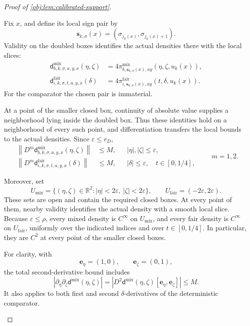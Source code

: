 \begin{proof}[Proof of \cref{obj:lem:calibrated-support}]
\begin{enumerate}
Fix \(x\), and define its local sign pair by
\[
\mathbf s_{k,\sigma}(x)
=(\sigma_{j_k(x)},\sigma_{j_k(x)+1}).
\]
Validity on the doubled boxes identifies the actual densities there with the local slices:
\[
\begin{aligned}
\mathsf d^{\mathrm{mix}}_{b,k,\sigma,a,y,x}(\eta,\zeta)
&=4\pi^{\mathrm{mix}}_{b,\mathbf s_{k,\sigma}(x),ay}
                    (\eta,\zeta,u_k(x)),\\
\mathsf d^{\mathrm{fair}}_{\iota,k,\sigma,t,a,y,x}(\delta)
&=4\pi^{\mathrm{fair}}_{\iota,\mathbf s_{k,\sigma}(x),ay}
                    (t,\delta,u_k(x)).
\end{aligned}
\]
For the comparator the chosen pair is immaterial.

At a point of the smaller closed box, continuity of absolute value supplies a neighborhood lying inside the doubled box. Thus these identities hold on a neighborhood of every such point, and differentiation transfers the local bounds to the actual densities. Since \(\varepsilon\le r_D\),
\[
\begin{aligned}
\left\|D^m\mathsf d^{\mathrm{mix}}_{b,k,\sigma,a,y,x}
                            (\eta,\zeta)\right\|&\le M,
&&|\eta|,|\zeta|\le\varepsilon,\\
\left\|D^m\mathsf d^{\mathrm{fair}}_{\iota,k,\sigma,t,a,y,x}
                            (\delta)\right\|&\le M,
&&|\delta|\le\varepsilon,\quad t\in[0,1/4],
\end{aligned}
\qquad m=1,2.
\]

Moreover, set
\[
U_{\mathrm{mix}}
=\{(\eta,\zeta)\in\mathbb R^2:
                   |\eta|<2\varepsilon,\ |\zeta|<2\varepsilon\},
\qquad
U_{\mathrm{fair}}
=(-2\varepsilon,2\varepsilon).
\]
These sets are open and contain the required closed boxes. At every point of them, nearby validity identifies the actual density with a smooth local slice. Because \(\varepsilon\le\rho\), every mixed density is \(C^\infty\) on \(U_{\mathrm{mix}}\), and every fair density is \(C^\infty\) on \(U_{\mathrm{fair}}\), uniformly over the indicated indices and over \(t\in[0,1/4]\). In particular, they are \(C^2\) at every point of the smaller closed boxes.

For clarity, with
\[
\mathbf e_\eta=(1,0),\qquad \mathbf e_\zeta=(0,1),
\]
the total second-derivative bound includes
\[
\left|\partial_\eta\partial_\zeta
       \mathsf d^{\mathrm{mix}}(\eta,\zeta)\right|
=\left|D^2\mathsf d^{\mathrm{mix}}(\eta,\zeta)
                  [\mathbf e_\eta,\mathbf e_\zeta]\right|
\le M.
\]
It also applies to both first and second \(\delta\)-derivatives of the deterministic comparator.


\end{enumerate}
\end{proof}
